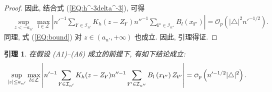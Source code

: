 \documentclass[a4paper,openay,14pt]{ctexbook}
\newtheorem{lem}{引理}
\numberwithin{equation}{section}
\numberwithin{lem}{section}
\begin{document}
\begin{proof}
        因此, 结合式 (\ref{EQ:h^-3delta^-3}), 可得
       \begin{align}
           &\sup_{ z < -a_{n'}}\max_{l\in\mathcal{L}}\left\vert n'^{-1}\sum_{\mathbf{i}'\in\mathcal{I}_{n'}}K_h(z-Z_{\mathbf{i}'})n''^{-1}\sum_{\mathbf{i}''\in\mathcal{I}_{n''}}B_{l}\left(x_{\mathbf{i}''}\right)\right\vert={\scriptstyle{\mathcal{O}}}_p\left(\vert\triangle\vert^2n'^{-1/2}\right).\label{EQ:bound}
       \end{align}
       同理, 式 (\ref{EQ:bound}) 对 $z\in\left(a_{n'},+\infty\right)$ 也成立. 因此, 引理得证.
    \end{proof}

\begin{lem}\label{Lemma:KB}
    在假设 (A1)--(A6) 成立的前提下, 有如下结论成立:
    \begin{align}
        &\sup_{\vert z\vert\leq a_{n'}}\max_{l\in\mathcal{L}}\left\vert n'^{-1}\sum_{\mathbf{i}'\in\mathcal{I}_{n'}}K_h(z-Z_{\mathbf{i}'})n''^{-1}\sum_{\mathbf{i}''\in\mathcal{I}_{n''}}B_{l}\left(x_{\mathbf{i}''}\right)Z_{\mathbf{i}''}\right\vert ={\scriptstyle{\mathcal{O}}}_p\left(n'^{-1/2}\vert\triangle\vert^2\right).\notag
    \end{align}
\end{lem}
\end{document}

